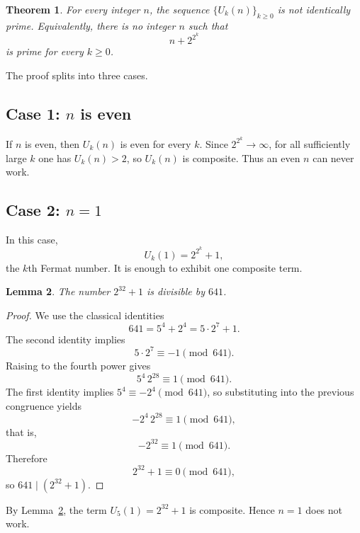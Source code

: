 \documentclass[11pt]{article}
\newtheorem{theorem}{Theorem}[section]
\newtheorem{lemma}[theorem]{Lemma}
\theoremstyle{remark}
\begin{document}
        \begin{theorem}\label{thm:always-prime-no}
          For every integer $n$, the sequence $\{U_k(n)\}_{k\ge 0}$ is \emph{not} identically prime. Equivalently, there is no integer $n$ such that
          \[
            n+2^{2^k}
          \]
          is prime for every $k\ge 0$.
        \end{theorem}

        The proof splits into three cases.

        \subsection*{Case 1: $n$ is even}

        If $n$ is even, then $U_k(n)$ is even for every $k$. Since $2^{2^k}\to\infty$, for all sufficiently large $k$ one has $U_k(n)>2$, so $U_k(n)$ is composite. Thus an even $n$ can never work.

        \subsection*{Case 2: $n=1$}

        In this case,
        \[
          U_k(1)=2^{2^k}+1,
        \]
        the $k$th Fermat number. It is enough to exhibit one composite term.

        \begin{lemma}\label{lem:641}
          The number $2^{32}+1$ is divisible by $641$.
        \end{lemma}

        \begin{proof}
          We use the classical identities
          \[
            641=5^4+2^4=5\cdot 2^7+1.
          \]
          The second identity implies
          \[
            5\cdot 2^7\equiv -1 \pmod{641}.
          \]
          Raising to the fourth power gives
          \[
            5^4\,2^{28}\equiv 1 \pmod{641}.
          \]
          The first identity implies $5^4\equiv -2^4\pmod{641}$, so substituting into the previous congruence yields
          \[
            -2^4\,2^{28}\equiv 1 \pmod{641},
          \]
          that is,
          \[
            -2^{32}\equiv 1 \pmod{641}.
          \]
          Therefore
          \[
            2^{32}+1\equiv 0 \pmod{641},
          \]
          so $641\mid (2^{32}+1)$.
        \end{proof}

        By Lemma~\ref{lem:641}, the term $U_5(1)=2^{32}+1$ is composite. Hence $n=1$ does not work.
\end{document}
